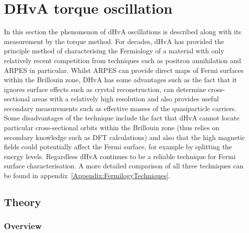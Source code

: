 
\section{\ac{DHvA} torque oscillation}

In this section the phenomenon of \ac{dHvA} oscillations is described along with its measurement by the torque method. For decades, \ac{dHvA} has provided the principle method of characterising the Fermiology of a material with only relatively recent competition from techniques such as positron annihilation and \ac{ARPES} in particular. Whilst \ac{ARPES} can provide direct maps of Fermi surfaces within the Brillouin zone, \ac{DHvA} has some advantages such as the fact that it ignores surface effects such as crystal reconstruction, can determine cross-sectional areas with a relatively high resolution and also provides useful secondary measurements such as effective masses of the quasiparticle carriers.  Some disadvantages of the technique include the fact that \ac{dHvA} cannot locate particular cross-sectional orbits within the Brillouin zone (thus relies on secondary knowledge such as \ac{DFT} calculations) and also that the high magnetic fields could potentially affect the Fermi surface, for example by splitting the energy levels. Regardless \ac{dHvA} continues to be a reliable technique for Fermi surface characterisation. A more detailed comparison of all three techniques can be found in appendix~\ref{Appendix:FermilogyTechniques}.

\subsection{Theory}

\subsubsection{Overview}

